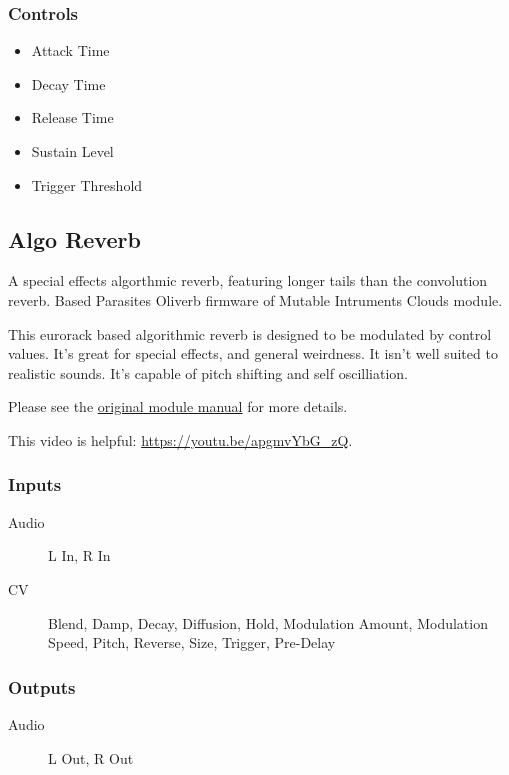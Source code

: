 \subsubsection{Controls}
\begin{itemize}
\item Attack Time
\item Decay Time
\item Release Time
\item Sustain Level
\item Trigger Threshold
\end{itemize}

\subsection{Algo Reverb}

A special effects algorthmic reverb, featuring longer tails than the convolution reverb. Based Parasites Oliverb firmware of Mutable Intruments Clouds module. 

This eurorack based algorithmic reverb is designed to be modulated by control values.
                 It's great for special effects, and general weirdness. It isn't well suited to realistic sounds. It's capable of pitch shifting and self oscilliation.

Please see the \href{https://mqtthiqs.github.io/parasites/clouds.html}{original module manual} for more details.

This video is helpful: \url{https://youtu.be/apgmvYbG_zQ}.

\subsubsection{Inputs}
\begin{description}
\item [Audio] L In, R In
\item [CV] Blend, Damp, Decay, Diffusion, Hold, Modulation Amount, Modulation Speed, Pitch, Reverse, Size, Trigger, Pre-Delay
\end{description}

\subsubsection{Outputs}
\begin{description}
\item [Audio] L Out, R Out
\end{description}

